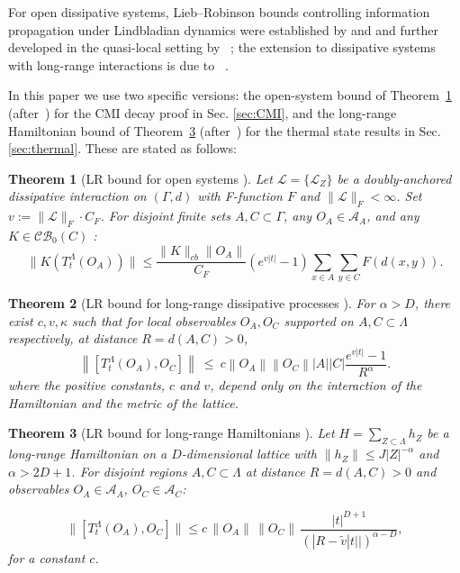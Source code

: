 \documentclass[11pt]{article}
\numberwithin{equation}{section}
\numberwithin{figure}{section}
\numberwithin{table}{section}
\theoremstyle{definition}
\theoremstyle{plain}
\newtheorem{thm}{Theorem}[section]
\theoremstyle{remark}
\newcommand{\La}{\Lambda}
\newcommand{\T}{T^\Lambda}
\newcommand{\norm}[1]{\left\lVert#1\right\rVert}
\newcommand{\abs}[1]{\left \vert#1\right\vert}
\begin{document}
For open dissipative systems, Lieb--Robinson bounds controlling information propagation under Lindbladian dynamics were established by \cite{Poulin_2010} and \cite{nachtergaele_lieb-robinson_2011} and further developed in the quasi-local setting by ~\cite{barthel_quasilocality_2012}; the extension to dissipative systems with long-range interactions is due to ~\cite{Sweke2019}.

In this paper we use two specific versions: the open-system bound of Theorem~\ref{thm:LR_open} (after~\cite{nachtergaele_lieb-robinson_2011,hastings_spectral_2006}) for the CMI decay proof in Sec. \ref{sec:CMI}, and the long-range Hamiltonian bound of Theorem~\ref{thm:LR_hamiltonian} (after~\cite{kuwahara_strictly_2020}) for the thermal state results in Sec. \ref{sec:thermal}. These are stated as follows:
\medskip

\begin{thm}[LR bound for open systems 
{\cite[Theorem~2]{nachtergaele_lieb-robinson_2011}}]
\label{thm:LR_open}
Let $\mathcal{L} = \{\mathcal{L}_Z\}$ be a doubly-anchored dissipative 
interaction on $(\Gamma,d)$ with F-function $F$ and $\|\mathcal{L}\|_F < \infty$. 
Set $v := \|\mathcal{L}\|_F \cdot C_F$. For disjoint finite sets 
$A,C \subset \Gamma$, any $O_A \in \mathcal{A}_A$, and any 
$K \in \mathcal{CB}_0(C)$ :
\begin{equation}
    \|K(T_t^\Lambda(O_A))\| \leq \frac{\|K\|_{cb}\|O_A\|}{C_F}
    \left(e^{v|t|}-1\right)
    \sum_{x\in A}\sum_{y\in C}F(d(x,y)).
    \label{eq:LR_open}
\end{equation}
\end{thm}

\medskip


\begin{thm}[LR bound for  long-range dissipative processes \cite{hastings_spectral_2006}]
\label{th:HKLR}
For $\alpha>D$, there exist $c,v,\kappa$ such that for local observables $O_A,O_C$ supported on $A,C\subset\Lambda$ respectively, at distance $R=d(A,C)>0$,
\begin{equation}\label{eq:Hastings}
\norm{[\T_t(O_A),O_C]}\ \le\ c\norm{O_A}\norm{O_C}\abs{A}\abs{C}\dfrac{e^{v \abs{t}}-1}{R^\alpha}.
\end{equation}
where the positive constants, $c$ and $v$, depend only on the interaction of the Hamiltonian and the metric of the lattice.
\end{thm}

\medskip

\begin{thm}[LR bound for long-range Hamiltonians 
{\cite[Theorem~1.2]{kuwahara_strictly_2020}}]
\label{thm:LR_hamiltonian}
Let $H = \sum_{Z \subset \Lambda} h_Z$ be a long-range Hamiltonian on 
a $D$-dimensional lattice with $\|h_Z\| \leq J|Z|^{-\alpha}$ and 
$\alpha > 2D+1$. 
For disjoint regions $A,C\subset \La$ at distance $R=d(A,C)>0$ and observables 
$O_A \in \mathcal{A}_A$, $O_C \in \mathcal{A}_C$:

\begin{equation}\label{eq:LRKuwahara}
\|[\T_t(O_A),O_C]\|
\le
c\, \|O_A\|\,\|O_C\|\,
\frac{|t|^{D+1}}{(|R - \tilde{v}|t||)^{\alpha - D}},
\end{equation}
for a constant $c$.
\end{thm}
\end{document}
